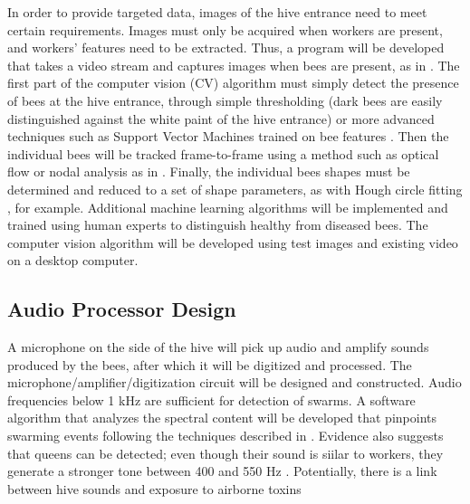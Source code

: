 In order to provide targeted data, images of the hive entrance need to meet certain requirements. Images must only be acquired when workers are present, and workers' features need to be extracted. Thus, a program will be developed that takes a video stream and captures images when bees are present, as in \cite{campbell2008video}. The first part of the computer vision (CV) algorithm must simply detect the presence of bees at the hive entrance, through simple thresholding (dark bees are easily distinguished against the white paint of the hive entrance) or more advanced techniques such as Support Vector Machines trained on bee features \cite{azarcoya2014automatic}. Then the individual bees will be tracked frame-to-frame using a method such as optical flow \cite{horn1981determining} or nodal analysis as in \cite{campbell2008video}. Finally, the individual bees shapes must be determined and reduced to a set of shape parameters, as with Hough circle fitting \cite{yuen1990comparative}, for example. Additional machine learning algorithms will be implemented and trained using human experts to distinguish healthy from diseased bees. The computer vision algorithm will be developed using test images and existing video on a desktop computer.

\subsection{Audio Processor Design}

A microphone on the side of the hive will pick up audio and amplify sounds produced by the bees, after which it will  be digitized and processed. The microphone/amplifier/digitization circuit will be designed and constructed. Audio frequencies below 1 kHz are sufficient for detection of swarms. A software algorithm that analyzes the spectral content will be developed that pinpoints swarming events following the techniques described in \cite{ferrari2008monitoring}. Evidence also suggests that queens can be detected; even though their sound is siilar to workers, they generate a stronger tone between 400 and 550 Hz \cite{eren1997electronic}. Potentially, there is a link between hive sounds and exposure to airborne toxins \cite{bromenshenk2009honey}

